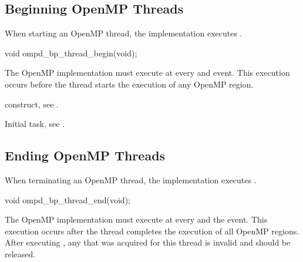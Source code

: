 \subsection{Beginning OpenMP Threads}
\label{subsubsec:ompd_bp_thread_begin}

\summary
When starting an OpenMP thread, the implementation executes
.

\format
\begin{cspecific}
\begin{ompSyntax}
void ompd_bp_thread_begin(void);
\end{ompSyntax}
\end{cspecific}

\descr
The OpenMP implementation must execute  at 
every  and  event.
This execution occurs before the thread starts the execution of any 
OpenMP region.

\begin{crossrefs}
\item {} construct, see .

\item Initial task, see .
\end{crossrefs}



\subsection{Ending OpenMP Threads}
\label{subsubsec:ompd_bp_thread_end}

\summary
When terminating an OpenMP thread, the implementation 
executes .

\format
\begin{cspecific}
\begin{ompSyntax}
void ompd_bp_thread_end(void);
\end{ompSyntax}
\end{cspecific}

\descr
The OpenMP implementation must execute  
at every  and the  event.
This execution occurs after the thread completes the execution of 
all OpenMP regions. After executing , any 
 that was acquired for this thread is invalid 
and should be released.


